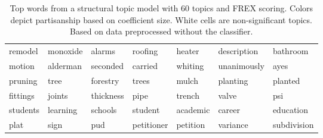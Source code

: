 \begin{table}[ht]
\begin{tabular}{lllllll}
  \cellcolor{red!10}remodel & \cellcolor{red!10}monoxide & \cellcolor{red!10}alarms & \cellcolor{red!10}roofing & \cellcolor{red!10}heater & \cellcolor{red!10}description & \cellcolor{red!10}bathroom \\ 
  \cellcolor{red!10}motion & \cellcolor{red!10}alderman & \cellcolor{red!10}seconded & \cellcolor{red!10}carried & \cellcolor{red!10}whiting & \cellcolor{red!10}unanimously & \cellcolor{red!10}ayes \\ 
  \cellcolor{white}pruning & \cellcolor{white}tree & \cellcolor{white}forestry & \cellcolor{white}trees & \cellcolor{white}mulch & \cellcolor{white}planting & \cellcolor{white}planted \\ 
  \cellcolor{red!10}fittings & \cellcolor{red!10}joints & \cellcolor{red!10}thickness & \cellcolor{red!10}pipe & \cellcolor{red!10}trench & \cellcolor{red!10}valve & \cellcolor{red!10}psi \\ 
  \cellcolor{white}students & \cellcolor{white}learning & \cellcolor{white}schools & \cellcolor{white}student & \cellcolor{white}academic & \cellcolor{white}career & \cellcolor{white}education \\ 
  \cellcolor{red!20}plat & \cellcolor{red!20}sign & \cellcolor{red!20}pud & \cellcolor{red!20}petitioner & \cellcolor{red!20}petition & \cellcolor{red!20}variance & \cellcolor{red!20}subdivision \\ 
   \hline
\end{tabular}
\endgroup
\caption{Top words from a structural topic model with 60 topics and FREX scoring. Colors depict partisanship based on coefficient size. White cells are non-significant topics. Based on data preprocessed without the classifier.} 
\end{table}

